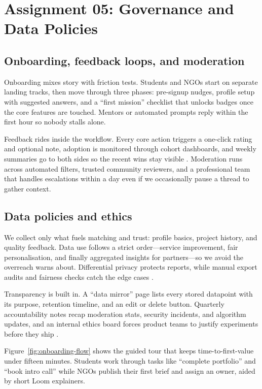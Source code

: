 \section*{Assignment 05: Governance and Data Policies}

\subsection*{Onboarding, feedback loops, and moderation}
Onboarding mixes story with friction tests. Students and NGOs start on separate landing tracks, then move through three phases: pre-signup nudges, profile setup with suggested answers, and a ``first mission'' checklist that unlocks badges once the core features are touched. Mentors or automated prompts reply within the first hour so nobody stalls alone.

Feedback rides inside the workflow. Every core action triggers a one-click rating and optional note, adoption is monitored through cohort dashboards, and weekly summaries go to both sides so the recent wins stay visible \citep{Reillier2017}. Moderation runs across automated filters, trusted community reviewers, and a professional team that handles escalations within a day even if we occasionally pause a thread to gather context.

\subsection*{Data policies and ethics}
We collect only what fuels matching and trust: profile basics, project history, and quality feedback. Data use follows a strict order—service improvement, fair personalisation, and finally aggregated insights for partners—so we avoid the overreach \citet{Zuboff2019} warns about. Differential privacy protects reports, while manual export audits and fairness checks catch the edge cases \citep{Srnicek2017}.

Transparency is built in. A ``data mirror'' page lists every stored datapoint with its purpose, retention timeline, and an edit or delete button. Quarterly accountability notes recap moderation stats, security incidents, and algorithm updates, and an internal ethics board forces product teams to justify experiments before they ship \citep{Choudary2016}.

Figure~\ref{fig:onboarding-flow} shows the guided tour that keeps time-to-first-value under fifteen minutes. Students work through tasks like ``complete portfolio'' and ``book intro call'' while NGOs publish their first brief and assign an owner, aided by short Loom explainers.


